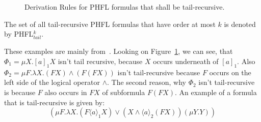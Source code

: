 \begin{figure}
    \caption{Derivation Rules for PHFL formulas that shall be tail-recursive.}
    \label{figure:phfl-tail-recursive}
\end{figure}

The set of all tail-recursive PHFL formulas that have order at most $k$ is denoted by PHFL$^k_{tail}$.

\begin{example}
    These examples are mainly from~\cite{lange2014capturing}. Looking on Figure~\ref{figure:phfl-tail-recursive}, we can
    see, that $\Phi_1 = \mu X.[a]_1 X$ isn't tail recursive, because $X$ occurs underneath of $[a]_1$. Also $\Phi_2 =
    \mu F .\lambda X. (F X) \wedge (F(F X))$ isn't tail-recursive because $F$ occurs on the left side of the logical
    operator $\wedge$. The second reason, why $\Phi_2$ isn't tail-recursive is because $F$ also occurs in $F X$ of
    subformula $F (F X)$. An example of a formula that is tail-recursive is given by:
    \[(\mu F. \lambda X. (F \langle a \rangle_1 X) \vee (X \wedge \langle a \rangle_2 (F X)) (\mu Y.Y))\]
\end{example}